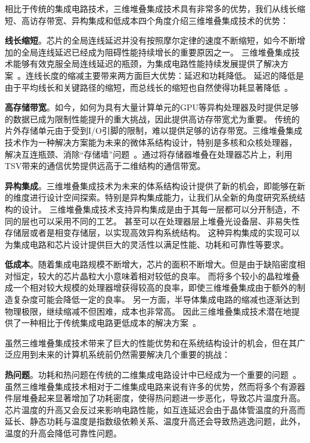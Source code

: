 相比于传统的集成电路技术，三维堆叠集成技术具有非常多的优势，我们从线长缩短、高访存带宽、异构集成和低成本四个角度介绍三维堆叠集成技术的优势：

\textbf{线长缩短}。芯片的全局连线延迟并没有按照摩尔定律的速度不断缩短，如今不断增加的全局连线延迟已经成为阻碍性能持续增长的重要原因之一。
三维堆叠集成技术能够有效克服全局连线延迟的瓶颈，为集成电路性能持续发展提供了解决方案~。连线长度的缩减主要带来两方面巨大优势：延迟和功耗降低。
延迟的降低是由于平均线长和关键路径的缩短，而总线长的缩短也自然使得功耗显著降低~。

\textbf{高存储带宽}。如今，如何为具有大量计算单元的GPU等异构处理器及时提供足够的数据已成为限制性能提升的重大挑战，因此提供高访存带宽尤为重要。
传统的片外存储单元由于受到I/O引脚的限制，难以提供足够的访存带宽。三维堆叠集成技术作为一种解决方案能为未来的微体系结构设计，特别是多核和众核处理器，
解决互连瓶颈、消除``存储墙''问题~。通过将存储器堆叠在处理器芯片上，利用TSV带来的通信优势提供远高于二维结构的通信带宽。

\textbf{异构集成}。三维堆叠集成技术为未来的体系结构设计提供了新的机会，即能够在新的维度进行设计空间探索。特别是异构集成能力，让我们从全新的角度研究系统结构的设计。
三维堆叠集成技术支持异构集成是由于其每一层都可以分开制造，不同的层也可以采用不同的工艺。
甚至可以在处理器层上堆叠光设备层、非易失性存储层或者是相变存储层，以实现高效异构系统结构。
这种异构集成的实现可以为集成电路和芯片设计提供巨大的灵活性以满足性能、功耗和可靠性等要求。

\textbf{低成本}。随着集成电路规模不断增大，芯片的面积不断增大。但是由于缺陷密度相对恒定，较大的芯片晶粒大小意味着相对较低的良率。
而将多个较小的晶粒堆叠成一个相对较大规模的处理器增获得较高的良率，即使三维堆叠集成由于额外的制造复杂度可能会降低一定的良率。
另一方面，半导体集成电路的缩减也逐渐达到物理极限，继续缩减不但困难，成本也非常高。
因此三维堆叠集成技术潜在地提供了一种相比于传统集成电路更低成本的解决方案~。


虽然三维堆叠集成技术带来了巨大的性能优势和在系统结构设计的机会，但在其广泛应用到未来的计算机系统前仍然需要解决几个重要的挑战：

\textbf{热问题}。功耗和热问题在传统的二维集成电路设计中已经成为一个重要的问题~。
虽然三维堆叠集成技术相对于二维集成电路来说有许多的优势，然而将多个有源器件层堆叠起来显著增加了功耗密度，使得热问题进一步恶化，导致芯片温度升高。
芯片温度的升高又会反过来影响电路性能，如互连延迟会由于晶体管温度的升高而延长、静态功耗与温度是指数级依赖关系、温度升高还会导致热逃逸问题，此外，温度的升高会降低可靠性问题。

